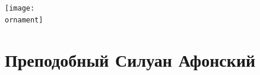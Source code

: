 \documentclass[12pt,a4paper]{article}
\newcommand{\ornament}{uzor_begin_2}
\newlength\headoff
\begin{document}
{\vspace*{-\headoff}}
{\setlength\parindent{0pt}\texttt{[image: \\ornament]}}


\newlength\firstcolumnwidth
\newlength\secondcolumnwidth

\newcommand\twocolumns[3]{
    \setlength\firstcolumnwidth{#1\linewidth}
    \setlength\secondcolumnwidth{\linewidth - \firstcolumnwidth - 0.1\linewidth}
    \begin{figure}[h]
    \begin{tabular}{p{\firstcolumnwidth} p{\secondcolumnwidth}}
    \vspace{1pt}#2 & #3 \\
    \end{tabular}
    \end{figure}
}





\section{Преподобный Силуан Афонский}


\setlength{}

\setlength{}
\end{document}
